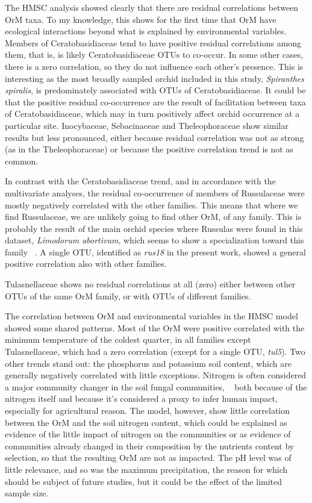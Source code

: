 The HMSC analysis showed clearly that there are residual correlations between OrM taxa. To my knowledge, this shows for the first time that OrM have ecological interactions beyond what is explained by environmental variables. Members of Ceratobasidiaceae tend to have positive residual correlations among them, that is, is likely Ceratobasidiaceae OTUs to co-occur. In some other cases, there is a zero correlation, so they do not influence each other's presence. This is interesting as the most broadly sampled orchid included in this study, \emph{Spiranthes spiralis}, is predominately associated with OTUs of Ceratobasidiaceae. It could be that the positive residual co-occurrence are the result of facilitation between taxa of Ceratobasidiaceae, which may in turn positively affect orchid occurrence at a particular site.
Inocybaceae, Sebacinaceae and Theleophoraceae show similar results but less pronounced, either because residual correlation was not as strong (as in the Theleophoraceae) or because the positive correlation trend is not as common.

In contrast with the Ceratobasidiaceae trend, and in accordance with the multivariate analyses, the residual co-occurrence of members of Russulaceae were mostly negatively correlated with the other families. This means that where we find Russulaceae, we are unlikely going to find other OrM, of any family. This is probably the result of the main orchid species where Russulas were found in this dataset, \emph{Limodorum abortivum}, which seems to show a specialization toward this family ~\citep{girlanda2005}. A single OTU, identified as \emph{rus18} in the present work, showed a general positive correlation also with other families.

Tulasnellaceae shows no residual correlations at all (zero) either between other OTUs of the same OrM family, or with OTUs of different families.

The correlation between OrM and environmental variables in the HMSC model showed some shared patterns. Most of the OrM were positive correlated with the minimum temperature of the coldest quarter, in all families except Tulasnellaceae, which had a zero correlation (except for a single OTU, \emph{tul5}). Two other trends stand out: the phosphorus and potassium soil content, which are generally negatively correlated with little exceptions.
Nitrogen is often considered a major community changer in the soil fungal communities, ~\citep{lilleskov2002} both because of the nitrogen itself and because it's considered a proxy to infer human impact, especially for agricultural reason. The model, however, show little correlation between the OrM and the soil nitrogen content, which could be explained as evidence of the little impact of nitrogen on the communities or as evidence of communities already changed in their composition by the nutrients content by selection, so that the resulting OrM are not as impacted.
The pH level was of little relevance, and so was the maximum precipitation, the reason for which should be subject of future studies, but it could be the effect of the limited sample size.

